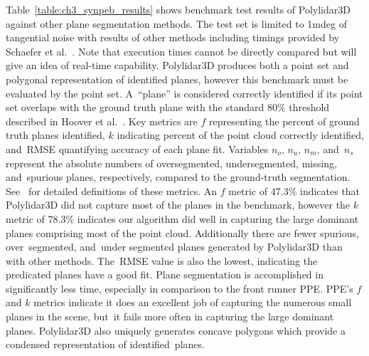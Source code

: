 Table~\ref{table:ch3_synpeb_results} shows benchmark test results of Polylidar3D against other plane segmentation methods. The test set is limited to 1mdeg of tangential noise with results of other methods including timings provided by Schaefer et al.~\cite{schaefer_maximum_2019}.  Note that execution times cannot be directly compared but will give an idea of real-time capability. Polylidar3D produces both a point set and polygonal representation of identified planes, however this benchmark must be evaluated by the point set.   A~``plane'' is considered correctly identified if its point set overlaps with the ground truth plane with the standard 80\% threshold described in Hoover et al.~\cite{hoover_experimental_1996}. Key metrics are $f$ representing the percent of ground truth planes identified, $k$ indicating percent of the point cloud correctly identified, and~RMSE quantifying accuracy of each plane fit. Variables $n_o$, $n_u$, $n_m$, and~$n_s$ represent the absolute numbers of  oversegmented,  undersegmented,  missing,  and~spurious  planes, respectively,  compared  to  the  ground-truth  segmentation. See~\cite{schaefer_maximum_2019,hoover_experimental_1996} for detailed definitions of these metrics. %
An $f$ metric of 47.3\% indicates that Polylidar3D did not capture most of the planes in the benchmark, however the $k$ metric of 78.3\% indicates our algorithm did well in capturing the large dominant planes comprising most of the point cloud.  Additionally there are fewer spurious, over~segmented, and~under segmented planes generated by Polylidar3D than with other methods. The~RMSE value is also the lowest, indicating the predicated planes have a good fit. Plane segmentation is accomplished in significantly less time, especially in comparison to the front runner PPE. PPE's $f$ and $k$ metrics indicate it does an excellent job of capturing the numerous small planes in the scene, but~it fails more often in capturing the large dominant planes.  Polylidar3D also uniquely generates concave polygons which provide a condensed representation of identified~planes.



